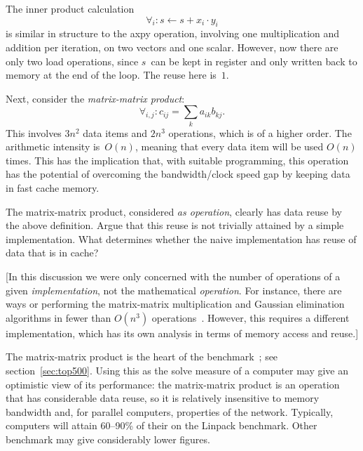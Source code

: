 The inner product calculation 
\[ \forall_i\colon s\leftarrow s+x_i\cdot y_i
\]
is similar in structure to the axpy operation, involving one
multiplication and addition per iteration, on two vectors and one
scalar. However, now there are only two load operations, since $s$~can
be kept in register and only written back to memory at the end of the
loop. The reuse here is~$1$.


Next, consider the \emph{matrix-matrix product}:
\[ \forall_{i,j}\colon c_{ij} = \sum_k a_{ik}b_{kj}. \] This involves
$3n^2$ data items and $2n^3$ operations, which is of a
higher order. The arithmetic intensity is~$O(n)$, meaning that every data item
will be used $O(n)$ times.  This has the implication that, with
suitable programming, this operation has the potential of overcoming
the bandwidth/clock speed gap by keeping data in fast cache memory.

\begin{exercise}
  The matrix-matrix product, considered \emph{as operation}, clearly
  has data reuse by the above definition. Argue that this reuse is not
  trivially attained by a simple implementation. What determines
  whether the naive implementation has  reuse of data that is in cache?
\end{exercise}

[In this discussion we were only concerned with the number of
  operations of a given \emph{implementation}, not the mathematical
  \emph{operation}. For instance, there are ways or performing the
  matrix-matrix multiplication and Gaussian elimination algorithms in
  fewer than $O(n^3)$
  operations~\cite{St:gaussnotoptimal,Pa:combinations}. However, this
  requires a different implementation, which has its own analysis in
  terms of memory access and reuse.]

The matrix-matrix product is the heart of the 
{benchmark}~\cite{Dongarra1987LinpackBenchmark}; see
section~\ref{sec:top500}. Using this as the solve measure of
 a computer may give an optimistic view of its
performance: the matrix-matrix product is an operation
that has considerable data reuse, so it is relatively insensitive to
memory bandwidth and, for parallel computers, properties of the
network. Typically, computers will attain 60--90\% of their
 on the Linpack benchmark. Other benchmark
may give considerably lower figures.

